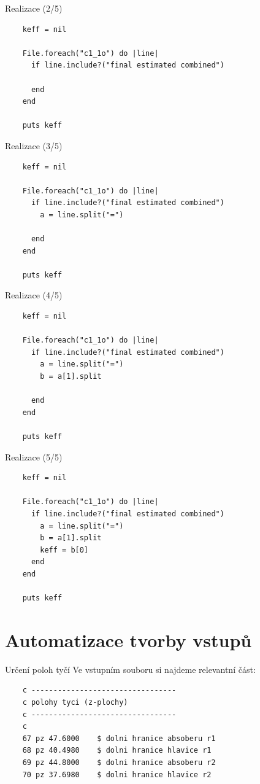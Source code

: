 \documentclass{beamer}
\begin{document}
\begin{frame}[fragile]{Realizace (2/5)}
  \scriptsize
  \begin{verbatim}
    keff = nil

    File.foreach("c1_1o") do |line|
      if line.include?("final estimated combined")

      end
    end

    puts keff
  \end{verbatim}
\end{frame}

\begin{frame}[fragile]{Realizace (3/5)}
  \scriptsize
  \begin{verbatim}
    keff = nil

    File.foreach("c1_1o") do |line|
      if line.include?("final estimated combined")
        a = line.split("=")

      end
    end

    puts keff
  \end{verbatim}
\end{frame}

\begin{frame}[fragile]{Realizace (4/5)}
  \scriptsize
  \begin{verbatim}
    keff = nil

    File.foreach("c1_1o") do |line|
      if line.include?("final estimated combined")
        a = line.split("=")
        b = a[1].split

      end
    end

    puts keff
  \end{verbatim}
\end{frame}

\begin{frame}[fragile]{Realizace (5/5)}
  \scriptsize
  \begin{verbatim}
    keff = nil

    File.foreach("c1_1o") do |line|
      if line.include?("final estimated combined")
        a = line.split("=")
        b = a[1].split
        keff = b[0]
      end
    end

    puts keff
  \end{verbatim}
\end{frame}


\section{Automatizace tvorby vstupů}

\begin{frame}[fragile]{Určení poloh tyčí}
  Ve vstupním souboru si najdeme relevantní část:
  \scriptsize
  \begin{verbatim}
    c ---------------------------------
    c polohy tyci (z-plochy)
    c ---------------------------------
    c
    67 pz 47.6000    $ dolni hranice absoberu r1
    68 pz 40.4980    $ dolni hranice hlavice r1
    69 pz 44.8000    $ dolni hranice absoberu r2
    70 pz 37.6980    $ dolni hranice hlavice r2
  \end{verbatim}
\end{frame}
\end{document}
